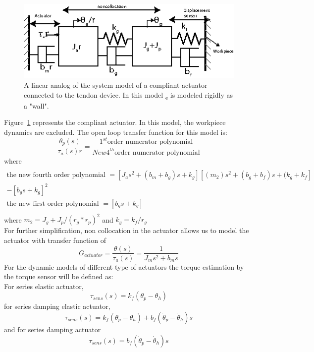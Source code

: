 \documentclass[a4paper,12pt]{article}
\begin{document}
\begin{figure}[h]
\centering
\includegraphics[scale=2]{seav3.eps}
\caption{A linear analog of the system model of a compliant actuator connected to the tendon device. In this model \texttau  \textsubscript{e} is modeled rigidly as a "wall".}
\label{fig:model3}
\end{figure}
Figure~\ref{fig:model3} represents the compliant actuator. In this model, the workpiece dynamics are excluded. The open loop transfer function for this model is:
\begin{equation}
\frac{\theta_p(s)}{\tau_a(s)r}=\frac{1^{st}\text{order numerator polynomial}}{New 4^{th}\text{order numerator polynomial}}
\end{equation}
where 
\begin{equation}
\begin{multlined}\\
\text{the new fourth order polynomial } = [J_as^2+(b_m+b_g)s+k_g][(m_2)s^2+(b_g+b_f)s+(k_g+k_f]\\-[b_gs+k_g]^2\\
\text{the new first order polynomial } = [b_gs+k_g]\\
\end{multlined}
\end{equation}
where $m_2=J_g+J_p/(r_g*r_p)^2$ and $k_g=k_f/r_g$\\
For further simplification, non collocation in the actuator allows us to model the actuator with transfer function of
\begin{equation}
G_{actuator}=\frac{\theta(s)}{\tau_a(s)}=\frac{1}{J_ms^2+b_ms}
\end{equation}
For the dynamic models of different type of actuators the torque estimation by the torque sensor will be defined as:\\
For series elastic actuator,
\begin{equation}
\tau_{sens}(s)=k_f(\theta_p-\theta_h)
\end{equation}
for series damping elastic actuator,
\begin{equation}
\tau_{sens}(s)=k_f(\theta_p-\theta_h)+b_f(\dot\theta_p-\dot\theta_h)s
\end{equation}
and for series damping actuator
\begin{equation}
\tau_{sens}(s)=b_f(\dot\theta_p-\dot\theta_h)s
\end{equation}
\end{document}
